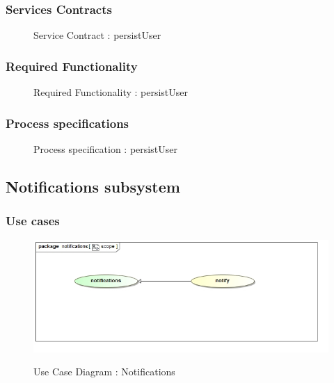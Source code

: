 \documentclass{article}
\begin{document}
		\subsubsection{Services Contracts}

		\begin{figure}[H]
		\caption{Service Contract : persistUser}
		\end{figure}

		\subsubsection{Required Functionality}

		\begin{figure}[H]
		\caption{Required Functionality : persistUser}
		\end{figure}

		\subsubsection{Process specifications}

		\begin{figure}[H]
		\caption{Process specification : persistUser}
		\end{figure}

	\subsection{Notifications subsystem}
		\subsubsection{Use cases}

		\begin{figure}[H]
		\includegraphics[width=\textwidth]{images/uc__notifications__scope.jpg}  \\
		\caption{Use Case Diagram : Notifications}
		\end{figure}
\end{document}

